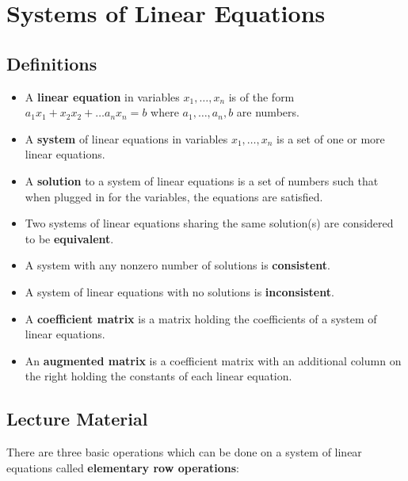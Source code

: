 \documentclass{article}
\begin{document}
\section{Systems of Linear Equations}


\subsection{Definitions}

\begin{itemize}

\item
A \textbf{linear equation} in variables $ x_1, \dots, x_n $ is of the form
$ a_1 x_1 + x_2 x_2 + \dots a_n x_n = b $ where $ a_1, \dots, a_n, b $ are
numbers.

\item
A \textbf{system} of linear equations in variables $ x_1, \dots, x_n $ is a
set of one or more linear equations.

\item
A \textbf{solution} to a system of linear equations is a set of numbers such
that when plugged in for the variables, the equations are satisfied.

\item
Two systems of linear equations sharing the same solution(s) are considered to
be \textbf{equivalent}.

\item
A system with any nonzero number of solutions is \textbf{consistent}.

\item
A system of linear equations with no solutions is \textbf{inconsistent}.

\item
A \textbf{coefficient matrix} is a matrix holding the coefficients of a system
of linear equations.

\item
An \textbf{augmented matrix} is a coefficient matrix with an additional column
on the right holding the constants of each linear equation.

\end{itemize}


\subsection{Lecture Material}

There are three basic operations which can be done on a system of linear
equations called \textbf{elementary row operations}:
\end{document}
